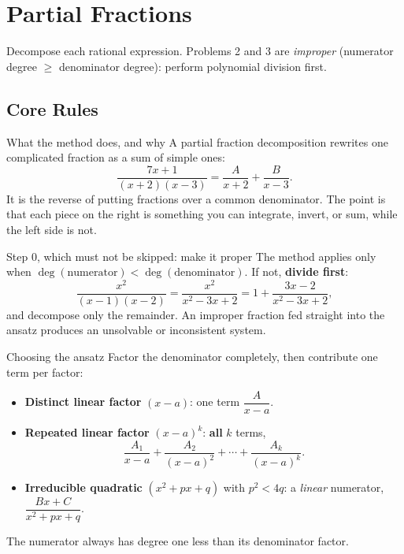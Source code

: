 \chapter{Partial Fractions}

Decompose each rational expression. Problems 2 and 3 are \emph{improper}
(numerator degree $\ge$ denominator degree): perform polynomial division
first.

\section{Core Rules}

\begin{rulebox}{What the method does, and why}
A partial fraction decomposition rewrites one complicated fraction as a sum
of simple ones:
\[
  \frac{7x+1}{(x+2)(x-3)}=\frac{A}{x+2}+\frac{B}{x-3} .
\]
It is the reverse of putting fractions over a common denominator. The point
is that each piece on the right is something you can integrate, invert, or
sum, while the left side is not.
\end{rulebox}

\begin{rulebox}{Step 0, which must not be skipped: make it proper}
The method applies only when $\deg(\text{numerator})<\deg(\text{denominator})$.
If not, \textbf{divide first}:
\[
  \frac{x^{2}}{(x-1)(x-2)}
  =\frac{x^{2}}{x^{2}-3x+2}
  =1+\frac{3x-2}{x^{2}-3x+2} ,
\]
and decompose only the remainder. An improper fraction fed straight into the
ansatz produces an unsolvable or inconsistent system.
\end{rulebox}

\begin{rulebox}{Choosing the ansatz}
Factor the denominator completely, then contribute one term per factor:
\begin{itemize}[leftmargin=1.6em,itemsep=0.3ex]
  \item \textbf{Distinct linear factor} $(x-a)$: one term $\dfrac{A}{x-a}$.
  \item \textbf{Repeated linear factor} $(x-a)^{k}$: \textbf{all} $k$ terms,
        \[
          \frac{A_{1}}{x-a}+\frac{A_{2}}{(x-a)^{2}}+\cdots+\frac{A_{k}}{(x-a)^{k}} .
        \]
  \item \textbf{Irreducible quadratic} $(x^{2}+px+q)$ with $p^{2}<4q$:
        a \emph{linear} numerator, $\dfrac{Bx+C}{x^{2}+px+q}$.
\end{itemize}
The numerator always has degree one less than its denominator factor.
\end{rulebox}

